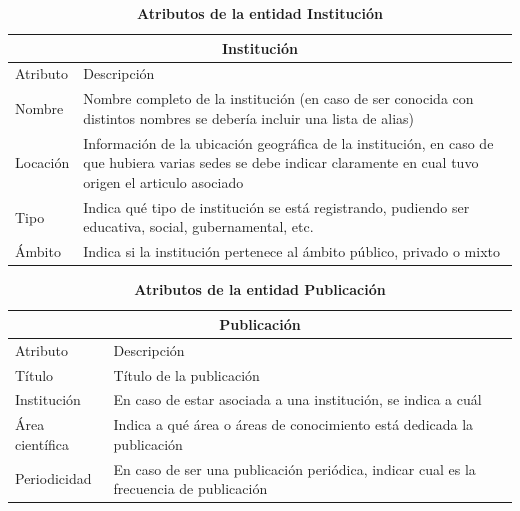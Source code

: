 \begin{table}[!h]
	\centering	
	\caption{\textbf{Atributos de la entidad Institución}}
	\begin{tabularx}{0.9\linewidth}{lX}
		\toprule
		\multicolumn{2}{c}{\textbf{Institución}}\\
		\midrule
		Atributo&Descripción\\
		\midrule
		Nombre&Nombre completo de la institución (en caso de ser conocida con distintos nombres se debería incluir una lista de alias)\\
		Locación&Información de la ubicación geográfica de la institución, en caso de que hubiera varias sedes se debe indicar claramente en cual tuvo origen el articulo asociado\\
		Tipo&Indica qué tipo de institución se está registrando, pudiendo ser educativa, social, gubernamental, etc.\\
		Ámbito&Indica si la institución pertenece al ámbito público, privado o mixto\\
		\bottomrule
	\end{tabularx}
	
	\label{tab:institucion}
\end{table}%

\begin{table}[!h]
	\centering	
	\caption{\textbf{Atributos de la entidad Publicación}}
	\begin{tabularx}{0.9\linewidth}{lX}
		\toprule
		\multicolumn{2}{c}{\textbf{Publicación}}\\
		\midrule
		Atributo&Descripción\\
		\midrule
		Título&Título de la publicación\\
		Institución&En caso de estar asociada a una institución, se indica a cuál\\
		Área científica&Indica a qué área o áreas de conocimiento está dedicada la publicación\\
		Periodicidad&En caso de ser una publicación periódica, indicar cual es la frecuencia de publicación\\
		
		\bottomrule
	\end{tabularx}
	
	\label{tab:publicacion}
\end{table}%

